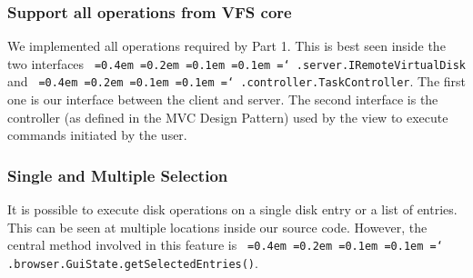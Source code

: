\documentclass[a4paper,12pt]{article}
\newcommand*\justify{%
  \fontdimen2\font=0.4em%
  \fontdimen3\font=0.2em%
  \fontdimen4\font=0.1em%
  \fontdimen7\font=0.1em%
  \hyphenchar\font=`\-%
}
\newcommand{\mono}[1]{\texttt{\justify #1}}
\begin{document}
\subsubsection{Support all operations from VFS core}
We implemented all operations required by Part 1. This is best seen inside the two interfaces \mono{.server.IRemoteVirtualDisk} and \mono{.controller.TaskController}. The first one is our interface between the client and server. The second interface is the controller (as defined in the MVC Design Pattern) used by the view to execute commands initiated by the user.

\subsubsection{Single and Multiple Selection}
It is possible to execute disk operations on a single disk entry or a list of entries. This can be seen at multiple locations inside our source code. However, the central method involved in this feature is \mono{.browser.GuiState.getSelectedEntries()}.
\end{document}
